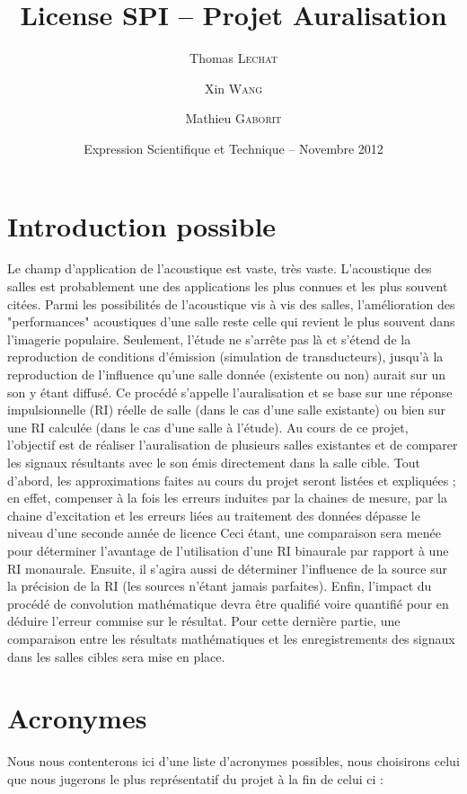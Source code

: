 \documentclass[a4paper, 11pt]{article}
\title{License SPI -- Projet Auralisation}
\author{Thomas \textsc{Lechat} \and Xin \textsc{Wang} \and Mathieu \textsc{Gaborit}}
\date{Expression Scientifique et Technique -- Novembre 2012}
\begin{document}
	\maketitle
    
    \section{Introduction possible}
    
Le champ d'application de l'acoustique est vaste, très vaste. L'acoustique des salles est probablement une des applications les plus connues et les plus souvent citées.
Parmi les possibilités de l'acoustique vis à vis des salles, l'amélioration des "performances" acoustiques d'une salle reste celle qui revient le plus souvent dans l'imagerie populaire.
Seulement, l'étude ne s'arrête pas là et s'étend de la reproduction de conditions d'émission (simulation de transducteurs), jusqu'à la reproduction de l'influence qu'une salle donnée (existente ou non) aurait sur un son y étant diffusé. Ce procédé s'appelle l'auralisation et se base sur une réponse impulsionnelle (RI) réelle de salle (dans le cas d'une salle existante) ou bien sur une RI calculée (dans le cas d'une salle à l'étude).
Au cours de ce projet, l'objectif est de réaliser l'auralisation de plusieurs salles existantes et de comparer les signaux résultants avec le son émis directement dans la salle cible.
Tout d'abord, les approximations faites au cours du projet seront listées et expliquées ; en effet, compenser à la fois les erreurs induites par la chaines de mesure, par la chaine d'excitation et les erreurs liées au traitement des données dépasse le niveau d'une seconde année de licence
Ceci étant,  une comparaison sera menée pour déterminer l'avantage de l'utilisation  d'une RI binaurale par rapport à une RI monaurale.
Ensuite, il s'agira aussi de déterminer l'influence de la source sur la précision de la RI (les sources n'étant jamais parfaites).
Enfin, l'impact du procédé de convolution mathématique devra être qualifié voire quantifié pour en déduire l'erreur commise sur le résultat.
Pour cette dernière partie, une comparaison entre les résultats mathématiques et les enregistrements des signaux dans les salles cibles sera mise en place.


\section{Acronymes} %
Nous nous contenterons ici d'une liste d'acronymes possibles, nous choisirons celui que nous jugerons le plus représentatif du projet à la fin de celui ci :
\end{document}
